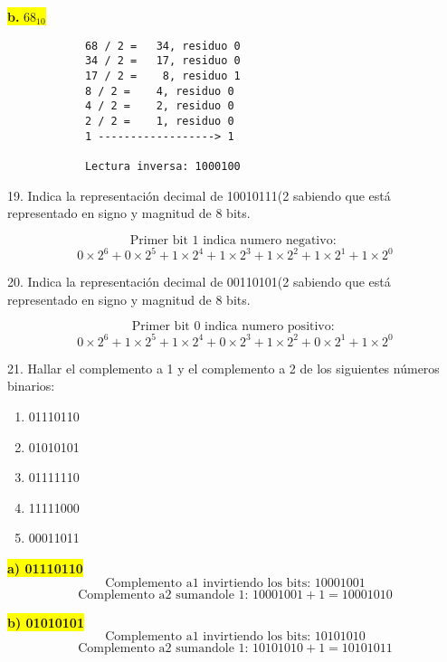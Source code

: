 \documentclass[a4paper,12pt]{article}
\begin{document}
	\begin{center}
		\colorbox{yellow}{{\textbf{b.} $68_{10}$}} \\ \vspace{0.3cm}
		\begin{Verbatim}
			68 / 2 =   34, residuo 0
			34 / 2 =   17, residuo 0
			17 / 2 =    8, residuo 1
			8 / 2 =    4, residuo 0
			4 / 2 =    2, residuo 0
			2 / 2 =    1, residuo 0
			1 ------------------> 1
			
			Lectura inversa: 1000100
		\end{Verbatim}
	\end{center}

	19. Indica la representación decimal de 10010111(2 sabiendo que está representado en signo y magnitud de 8 bits.
	\begin{center}
	\[
	\text{Primer bit 1 indica numero negativo: }
	\]
	\[
	0\times2^{6} + 0\times2^{5} + 1\times2^{4} + 1\times2^{3} + 1\times2^{2} + 1\times2^{1} + 1\times2^{0}
	\]
	\end{center}

	20. Indica la representación decimal de 00110101(2 sabiendo que está representado en signo y magnitud de 8 bits.
	\begin{center}
		\[
		\text{Primer bit 0 indica numero positivo: }
		\]
		\[
		0\times2^{6} + 1\times2^{5} + 1\times2^{4} + 0\times2^{3} + 1\times2^{2} + 0\times2^{1} + 1\times2^{0}
		\]
	\end{center}

	21. Hallar el complemento a 1 y el complemento a 2 de los siguientes números binarios:
	\begin{enumerate}
		\item 01110110
		\item 01010101
		\item 01111110
		\item 11111000
		\item 00011011
	\end{enumerate}
	
	\begin{center}
	\colorbox{yellow}{{\textbf{a) 01110110 }}}
	\[
	\text{Complemento a1 invirtiendo los bits: } 10001001
	\]
	\[
	\text{Complemento a2 sumandole 1: } 10001001 + 1 = 10001010
	\]
	\end{center}

	\begin{center}
		\colorbox{yellow}{{\textbf{b) 01010101 }}}
		\[
		\text{Complemento a1 invirtiendo los bits: } 10101010
		\]
		\[
		\text{Complemento a2 sumandole 1: } 10101010 + 1 = 10101011
		\]
	\end{center}
\end{document}
